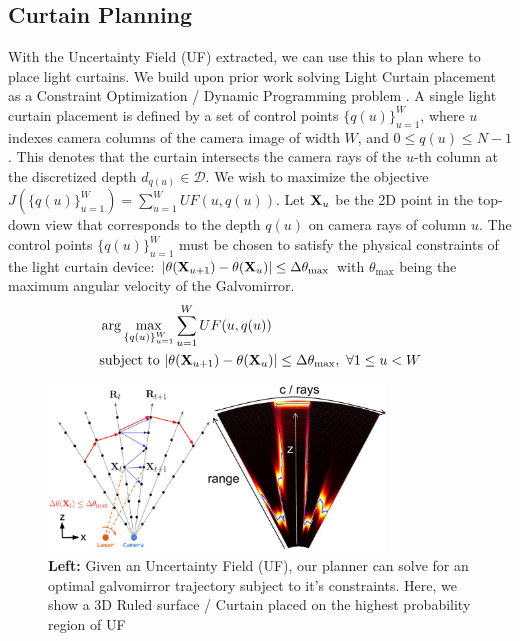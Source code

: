 \subsection{Curtain Planning}

With the Uncertainty Field (UF) extracted, we can use this to plan where to place light curtains. We build upon prior work solving Light Curtain placement as a Constraint Optimization / Dynamic Programming problem \cite{Ancha_2020_ECCV}. A single light curtain placement is defined by a set of control points $\{q(u)\}_{u=1}^W$, where $u$ indexes camera columns of the camera image of width $W$, and $0 \leq q(u) \leq N-1$. This denotes that the curtain intersects the camera rays of the $u$-th column at the discretized depth $d_{q(u)} \in \mathcal{D}$. We wish to maximize the objective $J(\{q(u)\}_{u=1}^W) = \sum_{u=1}^W UF(u, q(u))$. Let $\mathbf{X}_u$ be the 2D point in the top-down view that corresponds to the depth $q(u)$ on camera rays of column $u$. The control points $\{q(u)\}_{u=1}^W$ must be chosen to satisfy the physical constraints of the light curtain device: $|\theta(\mathbf{X}_{u+1}) - \theta(\mathbf{X}_u)| \leq \Delta \theta_\text{max}$ with $\theta_\text{max}$ being the maximum angular velocity of the Galvomirror.
\begin{align}
    &\arg \max_{\{q(u)\}_{u=1}^W} \sum_{u=1}^W UF(u, q(u)) \nonumber\\
    &\text{subject to}\ |\theta(\mathbf{X}_{u+1}) - \theta(\mathbf{X}_u)| \leq \Delta \theta_\text{max},\ \forall 1 \leq u < W
    \label{eq:constraint}
\end{align}

\begin{figure}[h]
   \centering
   \begin{minipage}{0.5\textwidth}
       \centering
       \includegraphics[width=0.8\textwidth]{figures/planner.pdf}
   \end{minipage}\hfill
   \centering
   \caption{\textbf{Left:} Given an Uncertainty Field (UF), our planner can solve for an optimal galvomirror trajectory subject to it's constraints. Here, we show a 3D Ruled surface / Curtain placed on the highest probability region of UF}
   \label{fig:plannerfig}
\end{figure}

